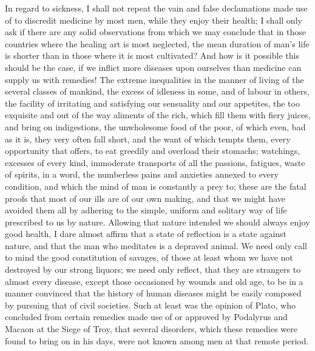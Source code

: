 \documentclass[11pt,twocolumn]{ltugboat}
\begin{document}
In regard to sickness, I shall not repeat the vain and false
declamations made use of to discredit medicine by most men, while they
enjoy their health; I shall only ask if there are any solid
observations from which we may conclude that in those countries where
the healing art is most neglected, the mean duration of man's life is
shorter than in those where it is most cultivated? And how is it
possible this should be the case, if we inflict more diseases upon
ourselves than medicine can supply us with remedies! The extreme
inequalities in the manner of living of the several classes of
mankind, the excess of idleness in some, and of labour in others, the
facility of irritating and satisfying our sensuality and our
appetites, the too exquisite and out of the way aliments of the rich,
which fill them with fiery juices, and bring on indigestions, the
unwholesome food of the poor, of which even, bad as it is, they very
often fall short, and the want of which tempts them, every opportunity
that offers, to eat greedily and overload their stomachs; watchings,
excesses of every kind, immoderate transports of all the passions,
fatigues, waste of spirits, in a word, the numberless pains and
anxieties annexed to every condition, and which the mind of man is
constantly a prey to; these are the fatal proofs that most of our ills
are of our own making, and that we might have avoided them all by
adhering to the simple, uniform and solitary way of life prescribed to
us by nature. Allowing that nature intended we should always enjoy
good health, I dare almost affirm that a state of reflection is a
state against nature, and that the man who meditates is a depraved
animal. We need only call to mind the good constitution of savages,
of those at least whom we have not destroyed by our strong liquors; we
need only reflect, that they are strangers to almost every disease,
except those occasioned by wounds and old age, to be in a manner
convinced that the history of human diseases might be easily composed
by pursuing that of civil societies. Such at least was the opinion of
Plato, who concluded from certain remedies made use of or approved by
Podalyrus and Macaon at the Siege of Troy, that several disorders,
which these remedies were found to bring on in his days, were not
known among men at that remote period.
\end{document}
